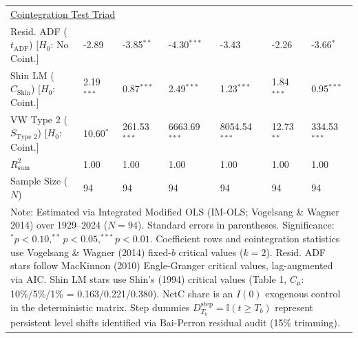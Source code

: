\begin{table}[H]
\begin{tabular}{p{3.8cm}p{2.1cm}p{2.1cm}p{2.1cm}p{2.1cm}p{2.1cm}p{2.1cm}}
\midrule
\multicolumn{7}{l}{\underline{Cointegration Test Triad}} \\
\makecell[l]{Resid. ADF ($t_{\text{ADF}}$) \\ {\scriptsize [$H_0$: No Coint.]}} & -2.89 & -3.85$^{**}$ & -4.30$^{***}$ & -3.43 & -2.26 & -3.66$^{*}$  \\
\makecell[l]{Shin LM ($C_{\text{Shin}}$) \\ {\scriptsize [$H_0$: Coint.]}} & 2.19$^{***}$ & 0.87$^{***}$ & 2.49$^{***}$ & 1.23$^{***}$ & 1.84$^{***}$ & 0.95$^{***}$  \\
\makecell[l]{VW Type 2 ($S_{\text{Type 2}}$) \\ {\scriptsize [$H_0$: Coint.]}} & 10.60$^{*}$ & 261.53$^{***}$ & 6663.69$^{***}$ & 8054.54$^{***}$ & 12.73$^{**}$ & 334.53$^{***}$  \\
\midrule
$R^2_{\text{sum}}$ & 1.00 & 1.00 & 1.00 & 1.00 & 1.00 & 1.00  \\
Sample Size ($N$) & 94 & 94 & 94 & 94 & 94 & 94  \\
\bottomrule
\multicolumn{7}{p{16.5cm}}{\footnotesize Note: Estimated via Integrated Modified OLS (IM-OLS; Vogelsang \& Wagner 2014) over 1929--2024 ($N=94$). Standard errors in parentheses. Significance: $^*p<0.10, ^{**}p<0.05, ^{***}p<0.01$. Coefficient rows and cointegration statistics use Vogelsang \& Wagner (2014) fixed-$b$ critical values ($k=2$). Resid. ADF stars follow MacKinnon (2010) Engle-Granger critical values, lag-augmented via AIC. Shin LM stars use Shin's (1994) critical values (Table 1, $C_\mu$: 10\%/5\%/1\% = 0.163/0.221/0.380). NetC share is an $I(0)$ exogenous control in the deterministic matrix. Step dummies $D^{\text{step}}_{T_b} = \mathbb{I}(t \ge T_b)$ represent persistent level shifts identified via Bai-Perron residual audit (15\% trimming).}
\end{tabular}
\end{table}
